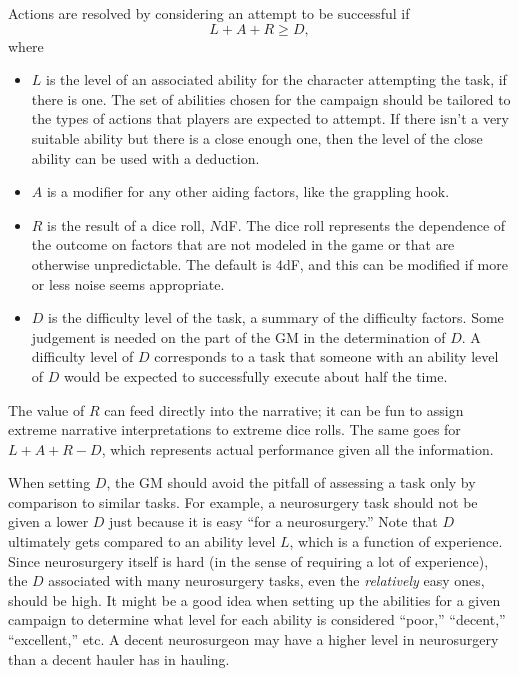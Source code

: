 Actions are resolved by considering an attempt to be successful if
$$L + A + R \geq D,$$
where
\begin{itemize}
\item
$L$ is the level of an associated ability for the character attempting the task, if there is one.
The set of abilities chosen for the campaign should be tailored to the types of actions that players are expected to attempt.
If there isn’t a very suitable ability but there is a close enough one, then the level of the close ability can be used with a deduction. 
\item
$A$ is a modifier for any other aiding factors, like the grappling hook.
\item
$R$ is the result of a dice roll, $N$dF.
The dice roll represents the dependence of the outcome on factors that are not modeled in the game or that are otherwise unpredictable.
The default is $4$dF, and this can be modified if more or less noise seems appropriate.
\item
$D$ is the difficulty level of the task, a summary of the difficulty factors.
Some judgement is needed on the part of the GM in the determination of $D$.
A difficulty level of $D$ corresponds to a task that someone with an ability level of $D$ would be expected to successfully execute about half the time.
\end{itemize}

The value of $R$ can feed directly into the narrative; it can be fun to assign extreme narrative interpretations to extreme dice rolls.
The same goes for $L + A + R - D$, which represents actual performance given all the information.

When setting $D$, the GM should avoid the pitfall of assessing a task only by comparison to similar tasks.
For example, a neurosurgery task should not be given a lower $D$ just because it is easy ``for a neurosurgery.''
Note that $D$ ultimately gets compared to an ability level $L$, which is a function of experience.
Since neurosurgery itself is hard (in the sense of requiring a lot of experience), the $D$ associated with many neurosurgery tasks, even the \emph{relatively} easy ones, should be high.
It might be a good idea when setting up the abilities for a given campaign to determine what level for each ability is considered ``poor,'' ``decent,'' ``excellent,'' etc.
A decent neurosurgeon may have a higher level in neurosurgery than a decent hauler has in hauling.

